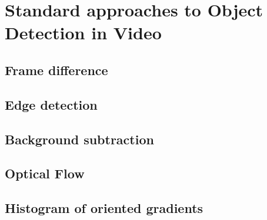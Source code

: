 \chapter{Standard approaches to Object Detection in Video}

\section*{Frame difference}
\section{Edge detection}
\section*{Background subtraction}
\section{Optical Flow}
\section{Histogram of oriented gradients}
\cite{bib:resnet}
